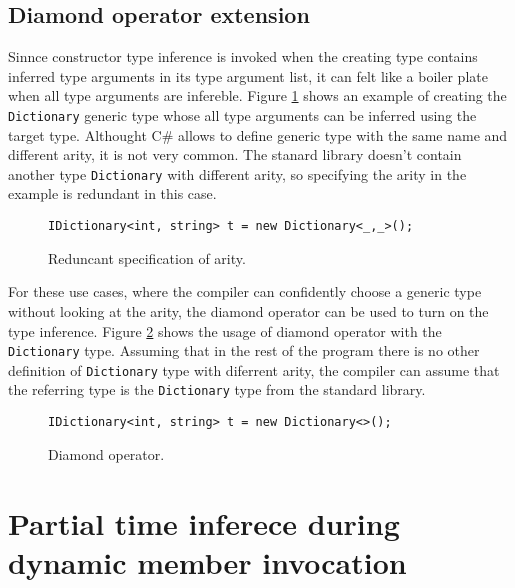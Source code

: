 \subsection{Diamond operator extension}

Sinnce constructor type inference is invoked when the creating type contains inferred type arguments in its type argument list, it can felt like a boiler plate when all type arguments are infereble.
Figure \ref{img57:diamondExample} shows an example of creating the \texttt{Dictionary} generic type whose all type arguments can be inferred using the target type.
Althought C\# allows to define generic type with the same name and different arity, it is not very common.
The stanard library doesn't contain another type \texttt{Dictionary} with different arity, so specifying the arity in the example is redundant in this case.
\begin{figure}[h!]
\begin{lstlisting}[style=csharp, mathescape=true]
IDictionary<int, string> t = new Dictionary<_,_>();
\end{lstlisting}
\caption{Reduncant specification of arity.}
\label{img57:diamondExample}
\end{figure}
\par
For these use cases, where the compiler can confidently choose a generic type without looking at the arity, the diamond operator can be used to turn on the type inference. 
Figure \ref{img58:diamondExample2} shows the usage of diamond operator with the \texttt{Dictionary} type.
Assuming that in the rest of the program there is no other definition of \texttt{Dictionary} type with diferrent arity, the compiler can assume that the referring type is the \texttt{Dictionary} type from the standard library. 
\begin{figure}[h!]
\begin{lstlisting}[style=csharp, mathescape=true]
IDictionary<int, string> t = new Dictionary<>();
\end{lstlisting}
\caption{Diamond operator.}
\label{img58:diamondExample2}
\end{figure}

\section{Partial time inferece during dynamic member invocation}

